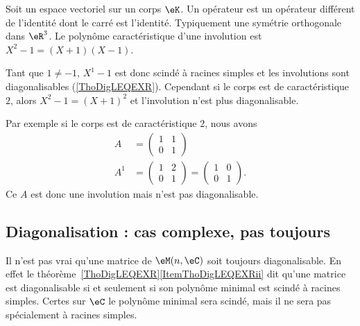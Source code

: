 \begin{example}     \label{ExewINgYo}
    Soit un espace vectoriel sur un corps \( \eK\). Un opérateur  est un opérateur différent de l'identité dont le carré est l'identité. Typiquement une symétrie orthogonale dans \( \eR^3\). Le polynôme caractéristique d'une involution est \( X^2-1=(X+1)(X-1)\).

    Tant que \( 1\neq -1\), \( X^1-1\) est donc scindé à racines simples et les involutions sont diagonalisables (\ref{ThoDigLEQEXR}). Cependant si le corps est de caractéristique \( 2\), alors \( X^2-1=(X+1)^2\) et l'involution n'est plus diagonalisable.

    Par exemple si le corps est de caractéristique \( 2\), nous avons
    \begin{subequations}
        \begin{align}
            A&=\begin{pmatrix}
                1    &   1    \\
                0    &   1
            \end{pmatrix}\\
            A^1&=\begin{pmatrix}
                1    &   2    \\
                0    &   1
            \end{pmatrix}=\begin{pmatrix}
                1    &   0    \\
                0    &   1
            \end{pmatrix}.
        \end{align}
    \end{subequations}
    Ce \( A\) est donc une involution mais n'est pas diagonalisable.
\end{example}

\subsection{Diagonalisation : cas complexe, pas toujours}

Il n'est pas vrai qu'une matrice de \( \eM(n,\eC)\) soit toujours diagonalisable. En effet le théorème~\ref{ThoDigLEQEXR}\ref{ItemThoDigLEQEXRii} dit qu'une matrice est diagonalisable si et seulement si son polynôme minimal est scindé à racines simples. Certes sur \( \eC\) le polynôme minimal sera scindé, mais il ne sera pas spécialement à racines simples.

